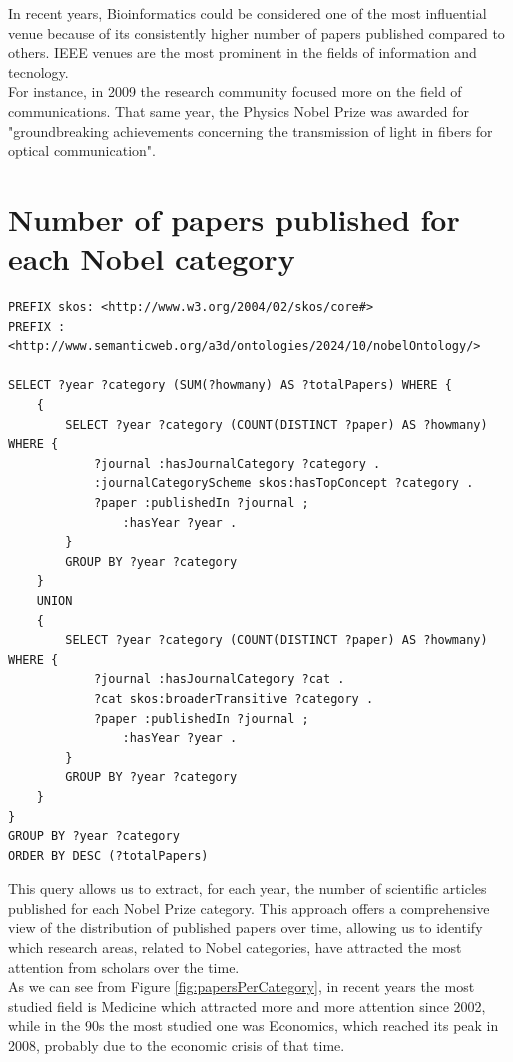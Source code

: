 \documentclass{article}
\begin{document}
In recent years, Bioinformatics could be considered one of the most influential
venue because of its consistently higher number of papers published compared to others.
IEEE venues are the most prominent in the fields of information and tecnology.\\
For instance, in 2009 the research community focused more on the field of
communications.
That same year, the Physics Nobel Prize was awarded for "groundbreaking achievements
concerning the transmission of light in fibers for optical communication".

\newpage

\section{Number of papers published for each Nobel category}
\begin{lstlisting}
PREFIX skos: <http://www.w3.org/2004/02/skos/core#>
PREFIX : <http://www.semanticweb.org/a3d/ontologies/2024/10/nobelOntology/>

SELECT ?year ?category (SUM(?howmany) AS ?totalPapers) WHERE {
    {
        SELECT ?year ?category (COUNT(DISTINCT ?paper) AS ?howmany) WHERE {
            ?journal :hasJournalCategory ?category .
            :journalCategoryScheme skos:hasTopConcept ?category .
            ?paper :publishedIn ?journal ;
                :hasYear ?year .
        }
        GROUP BY ?year ?category
    }
    UNION
    {
        SELECT ?year ?category (COUNT(DISTINCT ?paper) AS ?howmany) WHERE {
            ?journal :hasJournalCategory ?cat .
            ?cat skos:broaderTransitive ?category .
            ?paper :publishedIn ?journal ;
                :hasYear ?year .
        }
        GROUP BY ?year ?category
    }
}
GROUP BY ?year ?category
ORDER BY DESC (?totalPapers)
\end{lstlisting}

\vspace{1em}

This query allows us to extract, for each year, the number of scientific articles published for each Nobel Prize category. This approach offers a comprehensive view
of the distribution of published papers over time, allowing us to identify which research areas, related to Nobel categories, have attracted the most attention
from scholars over the time.\\

As we can see from Figure \ref{fig:papersPerCategory}, in recent years the most studied field is Medicine which attracted more and more attention since 2002, while in the
90s the most studied one was Economics, which reached its peak in 2008, probably due to the economic crisis of that time.
\end{document}
